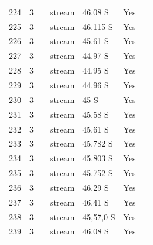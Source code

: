 \documentclass[12pt]{article}
\begin{document}
\begin{landscape}
\begin{table}[h!]
{\begin{tabular}{p{2.8cm}p{1.3cm}p{5.5cm}p{2.2cm}p{2.5cm}lp{3.5cm}}
        224   & 3 & \citet{Thompson2004c}  & stream & 46.08 S & Yes   &       \\
        225   & 3 & \citet{Thompson2004c}  & stream & 46.115 S & Yes   &       \\
        226   & 3 & \citet{Thompson2004c}  & stream & 45.61 S & Yes   &       \\
        227   & 3 & \citet{Thompson2004c}  & stream & 44.97 S & Yes   &       \\
        228   & 3 & \citet{Thompson2004c}  & stream & 44.95 S & Yes   &       \\
        229   & 3 & \citet{Thompson2004c}  & stream & 44.96 S & Yes   &       \\
        230   & 3 & \citet{Thompson2004c}  & stream & 45 S  & Yes   &       \\
        231   & 3 & \citet{Thompson2004c}  & stream & 45.58 S & Yes   &       \\
        232   & 3 & \citet{Thompson2004c}  & stream & 45.61 S & Yes   &       \\
        233   & 3 & \citet{Thompson2004c}  & stream & 45.782 S & Yes   &       \\
        234   & 3 & \citet{Thompson2004c}  & stream & 45.803 S & Yes   &       \\
        235   & 3 & \citet{Thompson2004c}  & stream & 45.752 S & Yes   &       \\
        236   & 3 & \citet{Thompson2004c}  & stream & 46.29 S & Yes   &       \\
        237   & 3 & \citet{Thompson2004c}  & stream & 46.41 S & Yes   &       \\
        238   & 3 & \citet{Thompson2004c}  & stream & 45,57,0 S & Yes   &       \\
        239   & 3 & \citet{Thompson2004c}  & stream & 46.08 S & Yes   &       \\
         \hline
      \end{tabular}}%
      \end{table}

        \newpage


\end{landscape}
\end{document}
